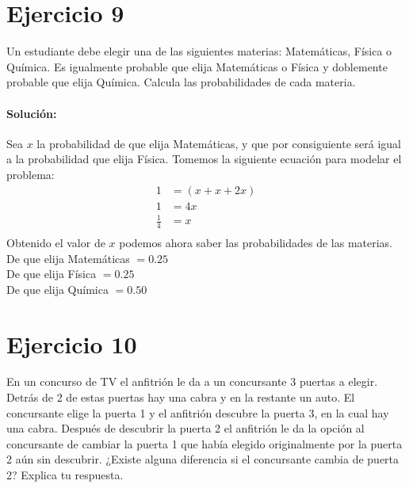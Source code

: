 \documentclass[12pt]{article}
\begin{document}
\section{Ejercicio 9}
Un estudiante debe elegir una de las siguientes materias: Matemáticas, Física o Química. Es
igualmente probable que elija Matemáticas o Física y doblemente probable que elija Química.
Calcula las probabilidades de cada materia.
\paragraph{Solución: } Sea $x$ la probabilidad de que elija Matemáticas, y que por consiguiente será igual a la probabilidad que elija Física. Tomemos la siguiente ecuación para modelar el problema:
\begin{equation}
	\begin{split}
		1 &= (x + x + 2x)\\
		1 &= 4x\\
		\frac{1}{4} &= x\\
	\end{split}
\end{equation}
Obtenido el valor de $x$ podemos ahora saber las probabilidades de las materias.\\
De que elija Matemáticas $ = 0.25$\\
De que elija Física $ = 0.25$\\
De que elija Química $ = 0.50$\\
\section{Ejercicio 10}
En un concurso de TV el anfitrión le da a un concursante 3 puertas a elegir. Detrás de 2 de
estas puertas hay una cabra y en la restante un auto. El concursante elige la puerta 1 y el
anfitrión descubre la puerta 3, en la cual hay una cabra. Después de descubrir la puerta 2 el
anfitrión le da la opción al concursante de cambiar la puerta 1 que había elegido originalmente
por la puerta 2 aún sin descubrir. ¿Existe alguna diferencia si el concursante cambia de puerta
2? Explica tu respuesta.
\end{document}
